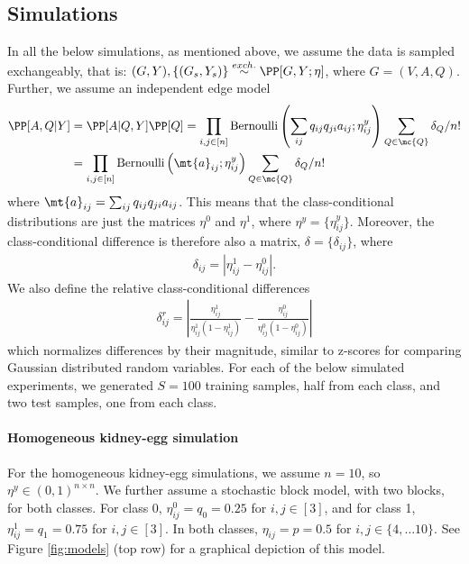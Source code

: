 \subsection{Simulations} %
\label{sub:simulations}

In all the below simulations, as mentioned above, we assume the data is sampled exchangeably, that is: $(G,Y), \{(G_s,Y_s)\} \overset{exch.}{\sim} \PP[G,Y; \eta]$, where $G=(V,A,Q)$.  Further, we assume an independent edge model
\begin{align}
\PP[A,Q | Y] &= \PP[A|Q,Y] \PP[Q] = \prod_{i,j \in [n]} \text{Bernoulli}\left(\sum_{ij} q_{ij} q_{ji} a_{ij}; \eta_{ij}^y\right) \sum_{Q\in \mc{Q}} \delta_Q/n! \\
&=  \prod_{i,j \in [n]} \text{Bernoulli}\left(\mt{a}_{ij}; \eta_{ij}^y\right) \sum_{Q\in \mc{Q}} \delta_Q/n!
\end{align}
where $\mt{a}_{ij} = \sum_{ij} q_{ij} q_{ji} a_{ij}$.  This means that the class-conditional distributions are just the matrices $\eta^0$ and $\eta^1$, where $\eta^y=\{\eta_{ij}^y\}$. Moreover, the class-conditional difference is therefore also a matrix, $\delta=\{\delta_{ij}\}$, where
\begin{align}
	\delta_{ij} = | \eta_{ij}^1-\eta_{ij}^0|.
\end{align}
We also define the relative class-conditional differences
\begin{align}
	\delta_{ij}^r = \left| \frac{\eta_{ij}^1}{\eta_{ij}^1 (1-\eta_{ij}^1)} - \frac{\eta_{ij}^0}{\eta_{ij}^0 (1-\eta_{ij}^0)} \right|
\end{align}
which normalizes differences by their magnitude, similar to z-scores for comparing Gaussian distributed random variables. For each of the below simulated experiments, we generated $S=100$ training samples, half from each class, and two test samples, one from each class.  



\paragraph{Homogeneous kidney-egg simulation} %
\label{par:homogeneous_kidney_egg_simulation}

For the homogeneous kidney-egg simulations, we assume $n=10$, so $\eta^y \in (0,1)^{n\times n}$.  We further assume a stochastic block model, with two blocks, for both classes.  For class 0, $\eta_{ij}^0=q_0=0.25$ for $i,j \in [3]$, and for class 1, $\eta_{ij}^1=q_1=0.75$ for $i,j \in [3]$.  In both classes, $\eta_{ij}=p=0.5$ for $i,j \in \{4,\ldots 10\}$.  See Figure \ref{fig:models} (top row) for a graphical depiction of this model.  


